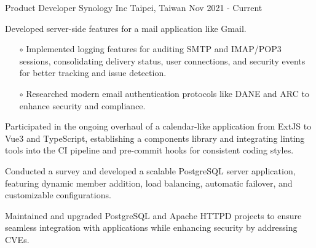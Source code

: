 \begin{cventries}
  \cventry
    {Product Developer} %
    {Synology Inc} %
    {Taipei, Taiwan} %
    {Nov 2021 - Current} %
    {
      \begin{cvitems} %
        \vspace{0.3em}
        \item {Developed server-side features for a mail application like Gmail.}
            \vspace{0.5em}
            \begin{itemize}
                \item[$\circ$] {Implemented logging features for auditing SMTP and IMAP/POP3 sessions, consolidating delivery status, user connections, and security events for better tracking and issue detection.}
                \item[$\circ$] {Researched modern email authentication protocols like DANE and ARC to enhance security and compliance.}
            \end{itemize}
        \vspace{0.8em}
        \item {Participated in the ongoing overhaul of a calendar-like application from ExtJS to Vue3 and TypeScript, establishing a components library and integrating linting tools into the CI pipeline and pre-commit hooks for consistent coding styles.}
        \vspace{0.8em}
        \item {Conducted a survey and developed a scalable PostgreSQL server application, featuring dynamic member addition, load balancing, automatic failover, and customizable configurations.}
        \vspace{0.8em}
        \item {Maintained and upgraded PostgreSQL and Apache HTTPD projects to ensure seamless integration with applications while enhancing security by addressing CVEs.}
      \end{cvitems}
    }
\end{cventries}
